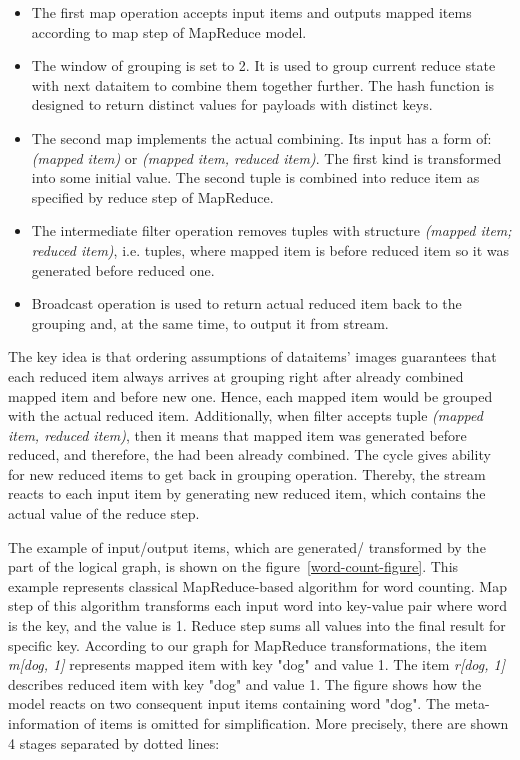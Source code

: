 \begin{itemize}
\item The first map operation accepts input items and outputs mapped items according to map step of MapReduce model.
\item The window of grouping is set to 2. It is used to group current reduce state with next dataitem to combine them together further. The hash function is designed to return distinct values for payloads with distinct keys.
\item The second map implements the actual combining. Its input has a form of: \textit{(mapped item)} or \textit{(mapped item, reduced item)}. The first kind is transformed into some initial value. The second tuple is combined into reduce item as specified by reduce step of MapReduce. 
\item The intermediate filter operation removes tuples with structure \textit{(mapped item; reduced item)}, i.e. tuples, where mapped item is before reduced item so it was generated before reduced one.
\item Broadcast operation is used to return actual reduced item back to the grouping and, at the same time, to output it from stream. 
\end{itemize}

The key idea is that ordering assumptions of dataitems' images guarantees that each reduced item always arrives at grouping right after already combined mapped item and before new one. Hence, each mapped item would be grouped with the actual reduced item. Additionally, when filter accepts tuple {\it (mapped item, reduced item)}, then it means that mapped item was generated before reduced, and therefore, the had been already combined. The cycle gives ability for new reduced items to get back in grouping operation. Thereby, the stream reacts to each input item by generating new reduced item, which contains the actual value of the reduce step.

The example of input/output items, which are generated/ transformed by the part of the logical graph, is shown on the figure~\ref {word-count-figure}. This example represents classical MapReduce-based algorithm for word counting. Map step of this algorithm transforms each input word into key-value pair where word is the key, and the value is 1. Reduce step sums all values into the final result for specific key. According to our graph for MapReduce transformations, the item {\it m[dog, 1]} represents mapped item with key "dog" and value 1. The item {\it r[dog, 1]} describes reduced item with key "dog" and value 1. The figure shows how the model reacts on two consequent input items containing word "dog". The meta-information of items is omitted for simplification. More precisely, there are shown 4 stages separated by dotted lines:


